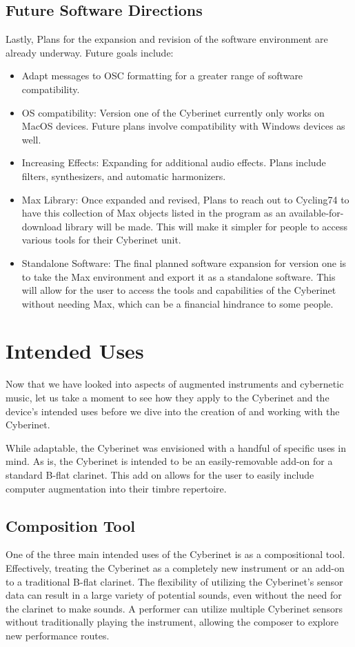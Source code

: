 \section{Future Software Directions}
Lastly, Plans for the expansion and revision of the software environment are already underway. Future goals include:
\begin{itemize}
    \item Adapt messages to OSC formatting for a greater range of software compatibility.
    \item OS compatibility: Version one of  the Cyberinet currently only works on MacOS devices. Future plans involve compatibility with Windows devices as well.
    \item Increasing Effects: Expanding for additional audio effects. Plans include filters, synthesizers, and automatic harmonizers.
    \item Max Library: Once expanded and revised, Plans to reach out to Cycling74 to have this collection of Max objects listed in the program as an available-for-download library will be made. This will make it simpler for people to access various tools for their Cyberinet unit.
    \item Standalone Software: The final planned software expansion for version one is to take the Max environment and export it as a standalone software. This will allow for the user to access the tools and capabilities of the Cyberinet without needing Max, which can be a financial hindrance to some people.
\end{itemize}

\chapter{Intended Uses}
Now that we have looked into aspects of augmented instruments and cybernetic music, let us take a moment to see how they apply to the Cyberinet and the device's intended uses before we dive into the creation of and working with the Cyberinet.

While adaptable, the Cyberinet was envisioned with a handful of specific uses in mind. As is, the Cyberinet is intended to be an easily-removable add-on for a standard B-flat clarinet. This add on allows for the user to easily include computer augmentation into their timbre repertoire. 

\section{Composition Tool}
One of the three main intended uses of the Cyberinet is as a compositional tool. Effectively, treating the Cyberinet as a completely new instrument or an add-on to a traditional B-flat clarinet. The flexibility of utilizing the Cyberinet's sensor data can result in a large variety of potential sounds, even without the need for the clarinet to make sounds. A performer can utilize multiple Cyberinet sensors without traditionally playing the instrument, allowing the composer to explore new performance routes.


